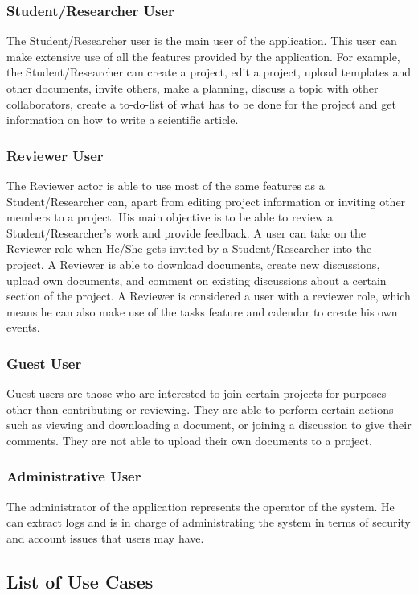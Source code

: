 \subsubsection{Student/Researcher User} 
The Student/Researcher user is the main user of the application. This user can make extensive use of all the features provided by the application. 
For example, the Student/Researcher can create a project, edit a project, upload templates and other documents, invite others, make a planning, discuss 
a topic with other collaborators, create a to-do-list of what has to be done for the project and get information on how to write a scientific article.

\subsubsection{Reviewer User} 
The Reviewer actor is able to use most of the same features as a Student/Researcher can, apart from editing project information or inviting other 
members to a project. His main objective is to be able to review a Student/Researcher's work and provide feedback. A user can take on the Reviewer role 
when He/She gets invited by a Student/Researcher into the project. A Reviewer is able to download documents, create new discussions, upload own 
documents, and comment on existing discussions about a certain section of the project. A Reviewer is considered a user with a reviewer role, which 
means he can also make use of the tasks feature and calendar to create his own events.

\subsubsection{Guest User} 
Guest users are those who are interested to join certain projects for purposes other than contributing or reviewing. They are able to perform certain
actions such as viewing and downloading a document, or joining a discussion to give their comments. They are not able to upload their own documents to 
a project.

\subsubsection{Administrative User} 
The administrator of the application represents the operator of the system. He can extract logs and is in charge of administrating the system in terms 
of security and account issues that users may have.

\subsection{List of Use Cases} %
\label{sub:list_of_use_cases}
